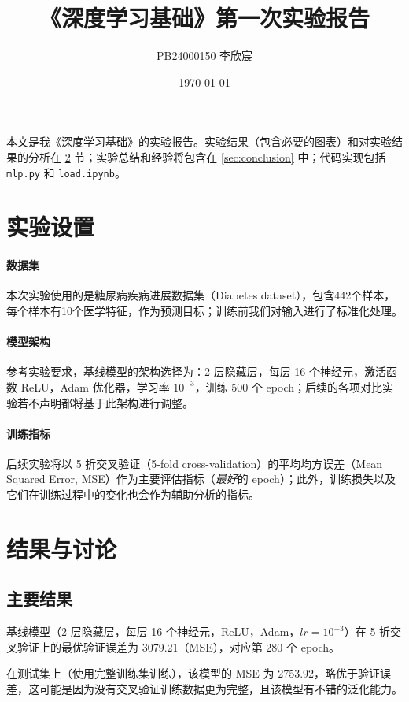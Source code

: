 \documentclass{ctexart}
\title{《深度学习基础》第一次实验报告}
\author{PB24000150 李欣宸}
\date{\today}
\begin{document}
\maketitle

本文是我《深度学习基础》的实验报告。实验结果（包含必要的图表）和对实验结果的分析在 \ref{sec:results-and-discussions} 节；实验总结和经验将包含在 \ref{sec:conclusion} 中；代码实现包括 \verb|mlp.py| 和 \verb|load.ipynb|。

\section{实验设置} \label{sec:experimental-setup}

\paragraph{数据集} 本次实验使用的是糖尿病疾病进展数据集（Diabetes dataset），包含442个样本，每个样本有10个医学特征，作为预测目标；训练前我们对输入进行了标准化处理。

\paragraph{模型架构} 参考实验要求，基线模型的架构选择为：2 层隐藏层，每层 16 个神经元，激活函数 ReLU，Adam 优化器，学习率 $10^{-3}$，训练 500 个 epoch；后续的各项对比实验若不声明都将基于此架构进行调整。

\paragraph{训练指标} 后续实验将以 5 折交叉验证（5-fold cross-validation）的平均均方误差（Mean Squared Error, MSE）作为主要评估指标（\textit{最好}的 epoch）；此外，训练损失以及它们在训练过程中的变化也会作为辅助分析的指标。

\section{结果与讨论} \label{sec:results-and-discussions}

\subsection{主要结果}

基线模型（2 层隐藏层，每层 16 个神经元，ReLU，Adam，$lr=10^{-3}$）在 5 折交叉验证上的最优验证误差为 3079.21（MSE），对应第 280 个 epoch。

在测试集上（使用完整训练集训练），该模型的 MSE 为 2753.92，略优于验证误差，这可能是因为没有交叉验证训练数据更为完整，且该模型有不错的泛化能力。
\end{document}
